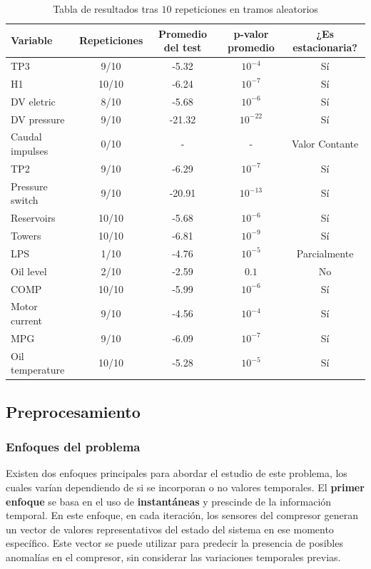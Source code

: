 \documentclass[12pt,letterpaper]{article}
\begin{document}
\begin{table}[htp]
    \centering
    \begin{tabular}{lcccc}
    \hline
    Variable & Repeticiones & Promedio del test & p-valor promedio & ¿Es estacionaria? \\
    \hline
    TP3 & 9/10 & -5.32 & $10^{-4}$ & Sí \\
    H1 & 10/10 & -6.24 & $10^{-7}$ & Sí \\
    DV eletric & 8/10 & -5.68 & $10^{-6}$ & Sí \\
    DV pressure & 9/10 & -21.32 & $10^{-22}$ & Sí \\
    Caudal impulses & 0/10 & - & - & Valor Contante \\
    TP2 & 9/10 & -6.29 & $10^{-7}$ & Sí \\
    Pressure switch & 9/10 & -20.91 & $10^{-13}$ & Sí \\
    Reservoirs & 10/10 & -5.68 & $10^{-6}$ & Sí \\
    Towers & 10/10 & -6.81 & $10^{-9}$ & Sí \\
    LPS & 1/10 & -4.76 & $10^{-5}$ & Parcialmente \\
    Oil level & 2/10 & -2.59 & $0.1$ & No \\
    COMP & 10/10 & -5.99 & $10^{-6}$ & Sí \\
    Motor current & 9/10 & -4.56 & $10^{-4}$ & Sí \\
    MPG & 9/10 & -6.09 & $10^{-7}$ & Sí \\
    Oil temperature & 10/10 & -5.28 & $10^{-5}$ & Sí \\
    \hline
    \end{tabular}
    \caption{Tabla de resultados tras $10$ repeticiones en tramos aleatorios}
    \label{tab:stationary_results}
\end{table}


\subsection{Preprocesamiento}

\subsubsection{Enfoques del problema}


Existen dos enfoques principales para abordar el estudio de este problema, los cuales varían dependiendo de si se incorporan o no valores temporales. El \textbf{primer enfoque} se basa en el uso de \textbf{instantáneas} y prescinde de la información temporal. En este enfoque, en cada iteración, los sensores del compresor generan un vector de valores representativos del estado del sistema en ese momento específico. Este vector se puede utilizar para predecir la presencia de posibles anomalías en el compresor, sin considerar las variaciones temporales previas.
\end{document}
